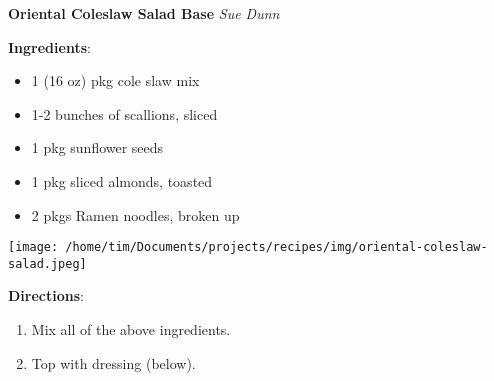 \documentclass[11pt, twoside, openany]{book}
\begin{document}
\noindent\begin{minipage}[t]{\linewidth}%
{\Large\textbf{Oriental Coleslaw Salad Base}} \label{oriental-coleslaw-salad-base}\hfill\textit{Sue Dunn}\\
\noindent\begin{minipage}[t]{0.78\linewidth}%
\textbf{Ingredients}:\vspace{-3mm}
\begin{multicols}{2}
\begin{itemize}\setlength\itemsep{-1mm}
\item 1 (16 oz) pkg cole slaw mix
\item 1-2 bunches of scallions, sliced
\item 1 pkg sunflower seeds
\item 1 pkg sliced almonds, toasted
\item 2 pkgs Ramen noodles, broken up
\end{itemize}
\end{multicols}
\end{minipage}
\noindent\begin{minipage}[t]{0.18\linewidth}
\centering \strut\vspace*{-\baselineskip}\newline
\texttt{[image: /home/tim/Documents/projects/recipes/img/oriental-coleslaw-salad.jpeg]}\\
\end{minipage}\vspace{3mm}
\textbf{Directions}:
\vspace{-3mm}\begin{enumerate}\setlength\itemsep{-1mm}
\item Mix all of the above ingredients.
\item Top with dressing (below).
\end{enumerate}
\end{minipage}\vspace{8mm}
\end{document}

